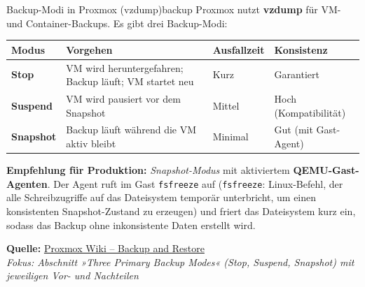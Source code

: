 \documentclass[a4paper,10pt,addpoints]{exam}
\begin{document}
\begin{infoBox}{Backup-Modi in Proxmox (vzdump)}{backup}
  Proxmox nutzt \textbf{vzdump} für VM- und Container-Backups.
  Es gibt drei Backup-Modi:

  \medskip
  \renewcommand{\arraystretch}{1.3}
  \begin{tabularx}{\textwidth}{lXXX}
    \toprule
    \textbf{Modus}    & \textbf{Vorgehen}                              & \textbf{Ausfallzeit} & \textbf{Konsistenz} \\
    \midrule
    \textbf{Stop}     & VM wird heruntergefahren; Backup läuft; VM
                        startet neu                                     & Kurz    & Garantiert \\
    \textbf{Suspend}  & VM wird pausiert vor dem Snapshot               & Mittel  & Hoch (Kompatibilität) \\
    \textbf{Snapshot} & Backup läuft während die VM aktiv bleibt        & Minimal & Gut (mit Gast-Agent) \\
    \bottomrule
  \end{tabularx}
  \renewcommand{\arraystretch}{1}

  \medskip
  \textbf{Empfehlung für Produktion:} \emph{Snapshot-Modus} mit aktiviertem
  \textbf{QEMU-Gast-Agenten}.
  Der Agent ruft im Gast \texttt{fsfreeze} auf
  (\texttt{fsfreeze}: Linux-Befehl, der alle Schreibzugriffe auf das Dateisystem
  temporär unterbricht, um einen konsistenten Snapshot-Zustand zu erzeugen)
  und friert das Dateisystem kurz ein, sodass das Backup ohne inkonsistente
  Daten erstellt wird.

  \medskip\small
  \textbf{Quelle:} \href{https://pve.proxmox.com/wiki/Backup_and_Restore}{Proxmox Wiki -- Backup and Restore}\\
  \hspace*{0.4em}\textit{Fokus: Abschnitt »Three Primary Backup Modes«
    (Stop, Suspend, Snapshot) mit jeweiligen Vor- und Nachteilen}
\end{infoBox}
\end{document}
